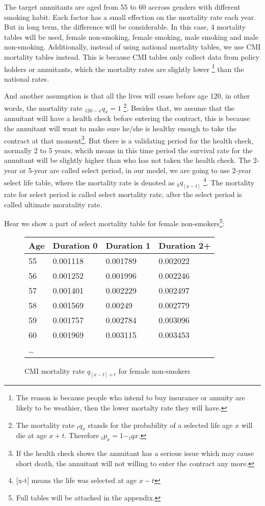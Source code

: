 \documentclass{report}
\begin{document}
The target annuitants are aged from 55 to 60 accross genders with different smoking habit. Each factor has a small effection on the mortality rate each year. But in long term, the difference will be considerable. In this case, 4 mortality tables will be used, female non-smoking, female smoking, male smoking and male non-smoking. Additionally, instead of using national mortality tables, we use CMI mortality tables instead. This is because CMI tables only collect data from policy holders or annuitants, which the mortality rates are slightly lower \footnote{The reason is because people who intend to buy insurance or annuity are likely to be weathier, then the lower mortalty rate they will have.} than the national rates.



And another assumption is that all the lives will cease before age 120, in other words, the mortality rate $_{120-x}q_{x}=1$ \footnote{The mortality rate $_tq_{x}$ stands for the probability of a selected life age $x$ will die at age $x+t$. Therefore $_tp_{x} = 1- _tq{x}$.}. Besides that, we assume that the annuitant will have a health check before entering the contract, this is because the annuitant will want to make sure he/she is healthy enough to take the contract at that moment\footnote{If the health check shows the annuitant has a serious issue which may cause short death, the annuitant will not willing to enter the contract any more.}. But there is a validating period for the health check, normally 2 to 5 years, whcih means in this time period the survival rate for the annuitant will be slightly higher than who has not taken the health check. The 2-year or 5-year are called select period, in our model, we are going to use 2-year select life table, where the mortality rate is denoted as $_kq_{[x-t]}$ \footnote{[x-t] means the life was selected at age $x-t$}. The mortality rate for select period is called select mortality rate, after the select period is called ultimate moratality rate.

Hear we show a part of select mortality table for female non-smokers\footnote{Full tables will be attached in the appendix.}:



\begin{figure}[H]
\begin{tabular}{p{2cm}p{2cm}p{2cm}p{2cm}}
Age              & Duration 0 & Duration 1 & Duration 2+    \\
\hline
55&0.001118&0.001789&0.002022    \\
56&0.001252&0.001996&0.002246  \\
57&0.001401&0.002229&0.002497\\
58&0.001569&0.00249&0.002779\\
59&0.001757&0.002784&0.003096\\
60&0.001969&0.003115&0.003453\\
\dots
\end{tabular}
\caption{CMI mortality rate $q_{[x-t]+t}$ for female non-smokers}
\end{figure}
\end{document}
